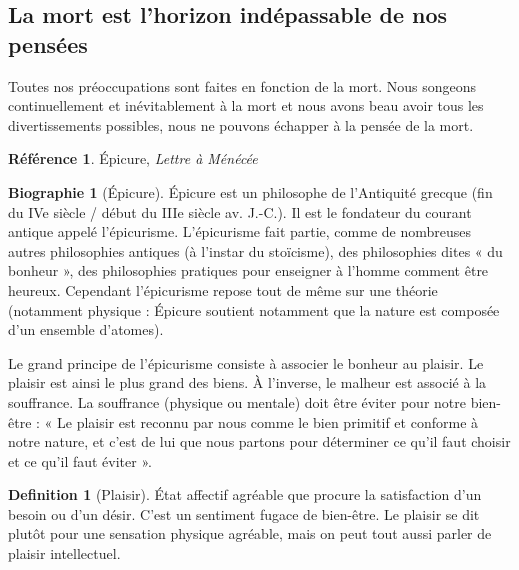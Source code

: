 \documentclass[french]{book}
\theoremstyle{definition}
\newtheorem*{dfn}{Definition}
\newtheorem*{refe}{Référence}
\newtheorem*{bio}{Biographie}
\begin{document}
\subsection{La mort est l’horizon indépassable de nos pensées}

Toutes nos préoccupations sont faites en fonction de la mort. Nous songeons continuellement et inévitablement à la mort et nous avons beau avoir tous les divertissements possibles, nous ne pouvons échapper à la pensée de la mort.

\begin{refe}
	Épicure, \textit{Lettre à Ménécée}
\end{refe}

\begin{bio}[Épicure]
	Épicure est un philosophe de l’Antiquité grecque (fin du IVe siècle / début du IIIe siècle av. J.-C.). Il est le fondateur du courant antique appelé l’épicurisme. L’épicurisme fait partie, comme de nombreuses autres philosophies antiques (à l’instar du stoïcisme), des philosophies dites « du bonheur », des philosophies pratiques pour enseigner à l’homme comment être heureux. Cependant l’épicurisme repose tout de même sur une théorie (notamment physique : Épicure soutient notamment que la nature est composée d’un ensemble d’atomes).
\end{bio}

Le grand principe de l’épicurisme consiste à associer le bonheur au plaisir. Le plaisir est ainsi le plus grand des biens. À l’inverse, le malheur est associé à la souffrance. La souffrance (physique ou mentale) doit être éviter pour notre bien-être : « Le plaisir est reconnu par nous comme le bien primitif et conforme à notre nature, et c’est de lui que nous partons pour déterminer ce qu’il faut choisir et ce qu’il faut éviter ».

\begin{dfn}[Plaisir]
État affectif agréable que procure la satisfaction d'un besoin ou d’un désir. C’est un sentiment fugace de bien-être. Le plaisir se dit plutôt pour une sensation physique agréable, mais on peut tout aussi parler de plaisir intellectuel.
\end{dfn}
\end{document}
